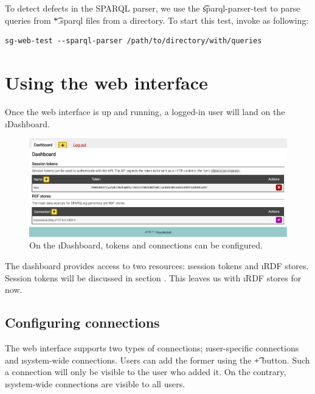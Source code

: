   To detect defects in the SPARQL parser, we use the \t{sparql-parser-test}
  to parse queries from \t{*.sparql} files from a directory.  To start this
  test, invoke  as following:

\begin{siderules}
\begin{verbatim}
sg-web-test --sparql-parser /path/to/directory/with/queries
\end{verbatim}
\end{siderules}

\pagebreak{}
\section{Using the web interface}
\label{sec:using-web-interface}

  Once the web interface is up and running, a logged-in user will land
  on the \i{Dashboard}.

  \begin{figure}[H]
    \begin{center}
      \includegraphics[width=1.0\textwidth]{figures/sg-web-dashboard.pdf}
    \end{center}
    \caption{On the \i{Dashboard}, tokens and connections can be
      configured.}
    \label{fig:web-dashboard}
  \end{figure}

  The dashboard provides access to two resources: \i{session tokens}
  and \i{RDF stores}.  Session tokens will be discussed in section
  .  This leaves us with \i{RDF stores} for now.

\subsection{Configuring connections}
\label{sec:configure-connections}

  The web interface supports two types of connections; \i{user-specific
    connections} and \i{system-wide connections}.  Users can add the
  former using the \t{+} button.  Such a connection will only be visible
  to the user who added it.  On the contrary, \i{system-wide connections}
  are visible to all users.

